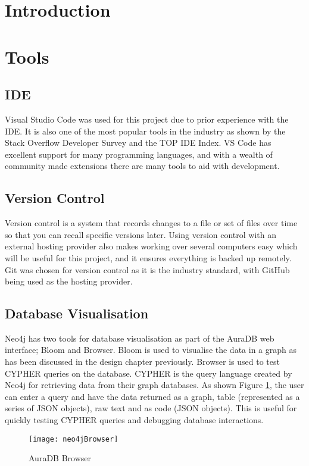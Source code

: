 \section{Introduction}
\section{Tools}
\subsection{IDE}
Visual Studio Code was used for this project due to prior experience with the IDE. It is also one of the most popular tools in the industry 
as shown by the Stack Overflow Developer Survey\cite{StackOverflowDeveloper} and the TOP IDE Index\cite{TOPIDETop}.
VS Code has excellent support for many programming languages, and with a wealth of community made extensions there are many tools to aid with development.
\subsection{Version Control}
Version control is a system that records changes to a file or set of files over time so that you can recall specific versions later.\cite{GitVersionControl}
Using version control with an external hosting provider also makes working over several computers easy which will be useful for this project, and it ensures everything is backed up remotely.
Git was chosen for version control as it is the industry standard, with GitHub being used as the hosting provider.
\subsection{Database Visualisation}
Neo4j has two tools for database visualisation as part of the AuraDB web interface; Bloom and Browser. Bloom is used to 
visualise the data in a graph as has been discussed in the design chapter previously. Browser is used to test CYPHER queries on the database.
CYPHER is the query language created by Neo4j for retrieving data from their graph databases. As shown Figure \ref{auraBrowser}, the user can enter a 
query and have the data returned as a graph, table (represented as a series of JSON objects), raw text and as code (JSON objects).
This is useful for quickly testing CYPHER queries and debugging database interactions.
\begin{figure}[!htbp]
    \centering
    \texttt{[image: neo4jBrowser]}
    \caption{AuraDB Browser}\label{auraBrowser}
\end{figure}
